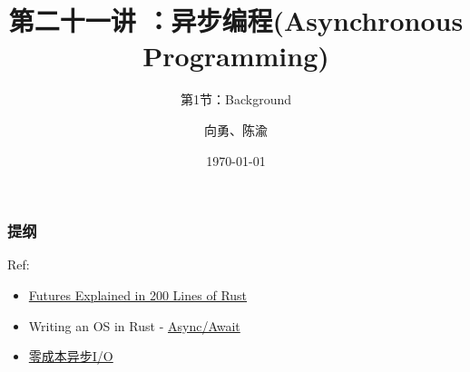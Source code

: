 


\title[第21讲]{第二十一讲 ：异步编程(Asynchronous Programming)} %
\subtitle{第1节：Background}
\author{向勇、陈渝} %
\date{\today} %



\begin{frame}
\titlepage %
\end{frame}

\begin{frame}
\frametitle{提纲} %
\tableofcontents %

Ref:
    \begin{itemize}
        \item \href{https://cfsamson.github.io/books-futures-explained/}{Futures Explained in 200 Lines of Rust}
        \item Writing an OS in Rust - \href{https://os.phil-opp.com/async-await/}{Async/Await}
        \item \href{https://zhuanlan.zhihu.com/p/97574385}{零成本异步I/O}
    \end{itemize}

\end{frame}
% 
% 
